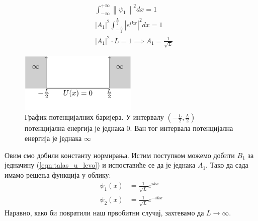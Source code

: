 \documentclass{tufte-handout} %
\theoremstyle{definition}
\theoremstyle{remark}
\newcommand{\norm}[1]{\left\lVert #1 \right\rVert}
\begin{document}
\begin{align*}
	&\displaystyle\int_{-\infty}^{+\infty}\norm{\psi_1}^2dx =1\\
	&\displaystyle|A_1|^2\int_{-\frac{L}{2}}^{\frac{L}{2}}|e^{ikx}|^2dx= 1\\
	&|A_1|^2 \cdot L = 1 \implies A_1 = \frac{1}{\sqrt{L}}
\end{align*}
\begin{figure}
	\centering
	\includegraphics[width=0.5\textwidth]{beskonacne_barijere.png}
	\caption{График потенцијалних баријера. У интервалу $\left(-\frac{L}{2}, \frac{L}{2}\right)$ потенцијална енергија је једнака 0. Ван тог интервала потенцијална енергија је једнака $\infty$}
\end{figure}
Овим смо добили константу нормирања. Истим поступком можемо добити $B_1$ за једначину (\ref{eqn:talas_u_levo}) и испоставиће се да је једнака $A_1$. Тако да сада имамо решења функција у облику:
\begin{align}
		\psi_1(x)&=\frac{1}{\sqrt{L}}e^{ikx}\\
		\psi_2(x)&=\frac{1}{\sqrt{L}}e^{-ikx} 
\end{align}
Наравно, како би повратили наш првобитни случај, захтевамо да $L\rightarrow\infty$. 
\end{document}
